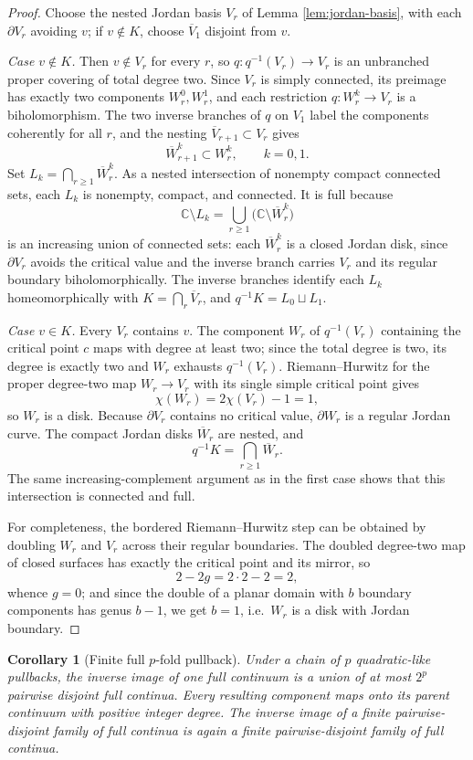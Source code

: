 \documentclass[11pt,reqno]{amsart}
\newtheorem{corollary}[theorem]{Corollary}
\theoremstyle{definition}
\theoremstyle{remark}
\begin{document}
\begin{proof}
Choose the nested Jordan basis \(V_r\) of Lemma \ref{lem:jordan-basis}, with each \(\partial V_r\) avoiding \(v\); if \(v\notin K\), choose \(\overline V_1\) disjoint from \(v\).

\emph{Case \(v\notin K\).}  Then \(v\notin V_r\) for every \(r\), so
\(q\colon q^{-1}(V_r)\to V_r\)
is an unbranched proper covering of total degree two.  Since \(V_r\) is simply connected, its preimage has exactly two components \(W_r^0,W_r^1\), and each restriction \(q\colon W_r^k\to V_r\) is a biholomorphism.  The two inverse branches of \(q\) on \(V_1\) label the components coherently for all \(r\), and the nesting \(\overline V_{r+1}\subset V_r\) gives
\[
 \overline W_{r+1}^k\subset W_r^k,\qquad k=0,1.
\]
Set \(L_k=\bigcap_{r\ge1}\overline W_r^k\).  As a nested intersection of nonempty compact connected sets, each \(L_k\) is nonempty, compact, and connected.  It is full because
\[
 \mathbb C\setminus L_k=\bigcup_{r\ge1}\bigl(\mathbb C\setminus\overline W_r^k\bigr)
\]
is an increasing union of connected sets: each \(\overline W_r^k\) is a closed Jordan disk, since \(\partial V_r\) avoids the critical value and the inverse branch carries \(V_r\) and its regular boundary biholomorphically.  The inverse branches identify each \(L_k\) homeomorphically with \(K=\bigcap_r\overline V_r\), and \(q^{-1}K=L_0\sqcup L_1\).

\emph{Case \(v\in K\).}  Every \(V_r\) contains \(v\).  The component \(W_r\) of \(q^{-1}(V_r)\) containing the critical point \(c\) maps with degree at least two; since the total degree is two, its degree is exactly two and \(W_r\) exhausts \(q^{-1}(V_r)\).  Riemann--Hurwitz for the proper degree-two map \(W_r\to V_r\) with its single simple critical point gives
\[
 \chi(W_r)=2\chi(V_r)-1=1,
\]
so \(W_r\) is a disk.  Because \(\partial V_r\) contains no critical value, \(\partial W_r\) is a regular Jordan curve.  The compact Jordan disks \(\overline W_r\) are nested, and
\[
 q^{-1}K=\bigcap_{r\ge1}\overline W_r.
\]
The same increasing-complement argument as in the first case shows that this intersection is connected and full.

For completeness, the bordered Riemann--Hurwitz step can be obtained by doubling \(W_r\) and \(V_r\) across their regular boundaries.  The doubled degree-two map of closed surfaces has exactly the critical point and its mirror, so
\[
 2-2g=2\cdot2-2=2,
\]
whence \(g=0\); and since the double of a planar domain with \(b\) boundary components has genus \(b-1\), we get \(b=1\), i.e.\ \(W_r\) is a disk with Jordan boundary.
\end{proof}
\begin{corollary}[Finite full \(p\)-fold pullback]\label{cor:finite-pullback}
Under a chain of \(p\) quadratic-like pullbacks, the inverse image of one full continuum is a union of at most \(2^p\) pairwise disjoint full continua.  Every resulting component maps onto its parent continuum with positive integer degree.  The inverse image of a finite pairwise-disjoint family of full continua is again a finite pairwise-disjoint family of full continua.
\end{corollary}
\end{document}
